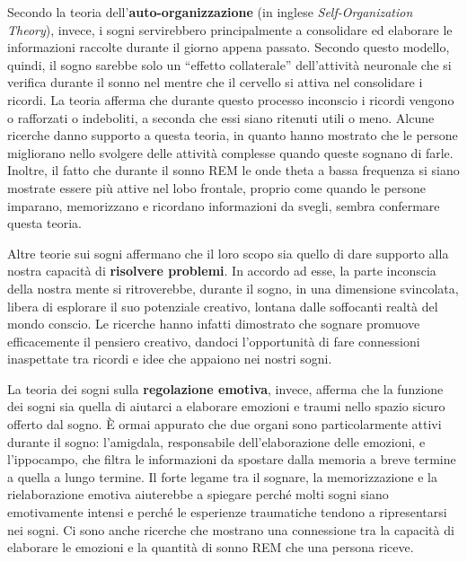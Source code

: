 Secondo la teoria dell'\textbf{auto-organizzazione} (in inglese \textit{Self-Organization Theory}), invece, i sogni
servirebbero principalmente a consolidare ed elaborare le informazioni raccolte durante il giorno appena passato.
Secondo questo modello, quindi, il sogno sarebbe solo un ``effetto collaterale'' dell'attività neuronale
che si verifica durante il sonno nel mentre che il cervello si attiva nel consolidare i ricordi.
La teoria afferma che durante questo processo inconscio i ricordi vengono o rafforzati o indeboliti, a seconda
che essi siano ritenuti utili o meno.
Alcune ricerche danno supporto a questa teoria, in quanto hanno mostrato che le persone migliorano nello svolgere
delle attività complesse quando queste sognano di farle.
Inoltre, il fatto che durante il sonno REM le onde theta a bassa frequenza si siano mostrate essere più attive nel
lobo frontale, proprio come quando le persone imparano, memorizzano e ricordano informazioni da svegli,
sembra confermare questa teoria.


Altre teorie sui sogni affermano che il loro scopo sia quello di dare supporto alla nostra capacità di \textbf{risolvere
problemi}.
In accordo ad esse, la parte inconscia della nostra mente si ritroverebbe, durante il sogno, in una dimensione
svincolata, libera di esplorare il suo potenziale creativo, lontana dalle soffocanti realtà del mondo conscio.
Le ricerche hanno infatti dimostrato che sognare promuove efficacemente il pensiero creativo, dandoci l'opportunità
di fare connessioni inaspettate tra ricordi e idee che appaiono nei nostri sogni.


La teoria dei sogni sulla \textbf{regolazione emotiva}, invece, afferma che la funzione dei sogni sia quella di aiutarci
a elaborare emozioni e traumi nello spazio sicuro offerto dal sogno.
\`E ormai appurato che due organi sono particolarmente attivi durante il sogno: l'amigdala,
responsabile dell'elaborazione delle emozioni, e l'ippocampo, che filtra
le informazioni da spostare dalla memoria a breve termine a quella a lungo termine.
Il forte legame tra il sognare, la memorizzazione e la rielaborazione emotiva aiuterebbe a spiegare perché molti sogni
siano emotivamente intensi e perché le esperienze traumatiche tendono a ripresentarsi nei sogni.
Ci sono anche ricerche che mostrano una connessione tra la capacità di elaborare le emozioni e la quantità di sonno
REM che una persona riceve. \newline

